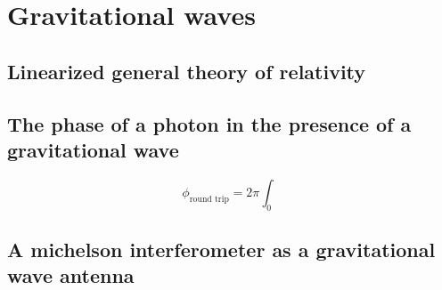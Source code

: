 \chapter{Gravitational waves}


\section{Linearized general theory of relativity}

% 

\section{The phase of a photon in the presence of a gravitational wave}

\begin{equation}
\phi_{\text{round trip}} = 2\pi\int_0
\end{equation}
\section{A michelson interferometer as a gravitational wave antenna}
